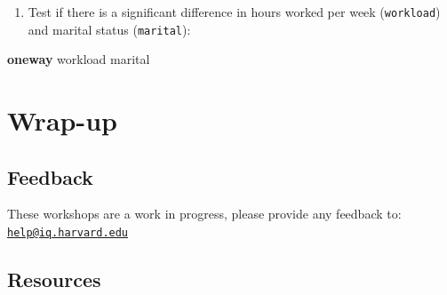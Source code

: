 \documentclass[
]{book}
\newenvironment{Shaded}{\begin{snugshade}}{\end{snugshade}}
\newcommand{\KeywordTok}[1]{\textcolor[rgb]{0.13,0.29,0.53}{\textbf{#1}}}
\newcommand{\NormalTok}[1]{#1}
\providecommand{\tightlist}{%
  \setlength{\itemsep}{0pt}\setlength{\parskip}{0pt}}
\begin{document}
\begin{enumerate}
\def\labelenumi{\arabic{enumi}.}
\setcounter{enumi}{2}
\tightlist
\item
  Test if there is a significant difference in hours worked per week (\texttt{workload}) and marital status (\texttt{marital}):
\end{enumerate}

\begin{Shaded}
\begin{Highlighting}[]
\KeywordTok{oneway}\NormalTok{ workload marital }
\end{Highlighting}
\end{Shaded}

\hypertarget{wrap-up-7}{%
\section{Wrap-up}\label{wrap-up-7}}

\hypertarget{feedback-7}{%
\subsection{Feedback}\label{feedback-7}}

These workshops are a work in progress, please provide any feedback to: \href{mailto:help@iq.harvard.edu}{\nolinkurl{help@iq.harvard.edu}}

\hypertarget{resources-10}{%
\subsection{Resources}\label{resources-10}}
\end{document}
